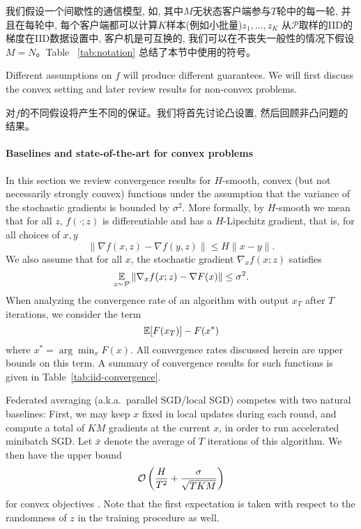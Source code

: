 我们假设一个间歇性的通信模型, 如\citet[Sec. 4.4]{woodworth18graphoracle}, 其中$M$无状态客户端参与$T$轮中的每一轮, 并且在每轮中, 每个客户端都可以计算$K$样本(例如小批量)$z_1, \dots, z_K$ 从$\mathcal{P}$取样的IID的梯度在IID数据设置中, 客户机是可互换的, 我们可以在不丧失一般性的情况下假设$M=N$。Table ~\ref{tab:notation} 总结了本节中使用的符号。

Different assumptions on $f$ will produce different guarantees. We will first discuss the convex setting and later review results for  non-convex problems.

对$f$的不同假设将产生不同的保证。我们将首先讨论凸设置, 然后回顾非凸问题的结果。

\paragraph{Baselines and state-of-the-art for convex problems}
In this section we review convergence results for $H$-smooth, convex (but not necessarily strongly convex) functions under the assumption that the variance of the stochastic gradients is bounded by $\sigma^2$.
More formally, by $H$-smooth we mean that for all $z$, $f(\cdot; z)$ is differentiable and has a $H$-Lipschitz gradient, that is, for all choices of $x, y$
\[ 
    \|\nabla f(x, z) - \nabla f(y, z)\| \leq H\|x-y\|.
\]
We also assume that for all $x$, the stochastic gradient $\nabla_x f(x; z)$ satisfies
\[
    \operatorname*{\mathbb{E}}_{z \sim \mathcal{P}}\|\nabla_x f(x; z) - \nabla F(x)\| \leq \sigma^2.
\]
When analyzing the convergence rate of an algorithm with output $x_T$ after $T$ iterations, we consider the term
\begin{equation}\label{eq:convergence_rate_term}
    \operatorname*{\mathbb{E}}[F(x_T)] - F(x^*)
\end{equation}
where $x^* = \arg\min_x F(x)$. All convergence rates discussed herein are upper bounds on this term.
A summary of convergence results for such functions is given in Table~\ref{tab:iid-convergence}. 

Federated averaging (a.k.a.\ parallel SGD/local SGD) competes with two natural baselines: First, we may keep $x$ fixed in local updates during each round, and compute a total of $K M$ gradients at the current $x$, in order to run accelerated minibatch SGD. Let $\bar{x}$ denote the average of $T$ iterations of this algorithm. We then have the upper bound
\[
 \mathcal{O} \left(\frac{H}{T^2} + \frac{\sigma}{\sqrt{T K M}}\right)
\]
for convex objectives \cite{Lan2012,cotter2011acmb,dekel12optimal}. Note that the first expectation is taken with respect to the randomness of $z$ in the training procedure as well.

